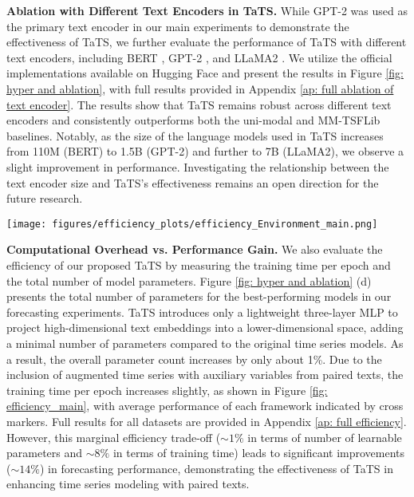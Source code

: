 \textbf{Ablation with Different Text Encoders in TaTS.}
While GPT-2 was used as the primary text encoder in our main experiments to demonstrate the effectiveness of TaTS, we further evaluate the performance of TaTS with different text encoders, including BERT \cite{DBLP:conf/naacl/DevlinCLT19}, GPT-2 \cite{radford2019language}, and LLaMA2 \cite{DBLP:journals/corr/abs-2307-09288}. We utilize the official implementations available on Hugging Face and present the results in Figure \ref{fig: hyper and ablation}, with full results provided in Appendix \ref{ap: full ablation of text encoder}. The results show that TaTS remains robust across different text encoders and consistently outperforms both the uni-modal and MM-TSFLib baselines. Notably, as the size of the language models used in TaTS increases from 110M (BERT) to 1.5B (GPT-2) and further to 7B (LLaMA2), we observe a slight improvement in performance. Investigating the relationship between the text encoder size and TaTS's effectiveness remains an open direction for the future research.


\begin{minipage}{0.5\linewidth}
  \texttt{[image: figures/efficiency\_plots/efficiency\_Environment\_main.png]}
\end{minipage}
\hfill
\begin{minipage}{0.47\linewidth}
  \label{fig: efficiency_main}
\end{minipage}


\textbf{Computational Overhead vs. Performance Gain.}
We also evaluate the efficiency of our proposed TaTS by measuring the training time per epoch and the total number of model parameters. Figure \ref{fig: hyper and ablation} (d) presents the total number of parameters for the best-performing models in our forecasting experiments. TaTS introduces only a lightweight three-layer MLP to project high-dimensional text embeddings into a lower-dimensional space, adding a minimal number of parameters compared to the original time series models. As a result, the overall parameter count increases by only about 1\%.
Due to the inclusion of augmented time series with auxiliary variables from paired texts, the training time per epoch increases slightly, as shown in Figure \ref{fig: efficiency_main}, with average performance of each framework indicated by cross markers. Full results for all datasets are provided in Appendix \ref{ap: full efficiency}. However, this marginal efficiency trade-off ($\sim1\%$ in terms of number of learnable parameters and $\sim8\%$ in terms of training time) leads to significant improvements ($\sim 14\%$) in forecasting performance, demonstrating the effectiveness of TaTS in enhancing time series modeling with paired texts.